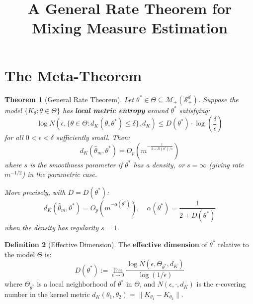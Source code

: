 \documentclass[11pt]{article}
\title{A General Rate Theorem for Mixing Measure Estimation}
\author{}
\date{}
\newtheorem{theorem}{Theorem}[section]
\theoremstyle{definition}
\newtheorem{definition}[theorem]{Definition}
\newcommand{\Splus}{\mathcal{S}_+^d}
\newcommand{\M}{\mathcal{M}}
\begin{document}
\maketitle

\section{The Meta-Theorem}

\begin{tcolorbox}[colback=blue!5!white, colframe=blue!50!black, title=Main Result]
\begin{theorem}[General Rate Theorem]
\label{thm:main}
Let $\theta^* \in \Theta \subseteq \M_+(\Splus)$. Suppose the model $\{K_\theta : \theta \in \Theta\}$ has \textbf{local metric entropy} around $\theta^*$ satisfying:
\begin{equation}
    \log N\left(\epsilon, \{\theta \in \Theta : d_K(\theta, \theta^*) \leq \delta\}, d_K\right) \leq D(\theta^*) \cdot \log\left(\frac{\delta}{\epsilon}\right)
\end{equation}
for all $0 < \epsilon < \delta$ sufficiently small. Then:
\begin{equation}
    \boxed{
    d_K(\hat{\theta}_m, \theta^*) = O_p\left(m^{-\frac{1}{2 + D(\theta^*)/s}}\right)
    }
\end{equation}
where $s$ is the smoothness parameter if $\theta^*$ has a density, or $s = \infty$ (giving rate $m^{-1/2}$) in the parametric case.

More precisely, with $D = D(\theta^*)$:
\begin{equation}
    \boxed{
    d_K(\hat{\theta}_m, \theta^*) = O_p\left(m^{-\alpha(\theta^*)}\right), \quad \alpha(\theta^*) = \frac{1}{2 + D(\theta^*)}
    }
\end{equation}
when the density has regularity $s = 1$.
\end{theorem}
\end{tcolorbox}

\begin{definition}[Effective Dimension]
\label{def:eff-dim}
The \textbf{effective dimension} of $\theta^*$ relative to the model $\Theta$ is:
\begin{equation}
    D(\theta^*) := \lim_{\epsilon \to 0} \frac{\log N(\epsilon, \Theta_{\theta^*}, d_K)}{\log(1/\epsilon)}
\end{equation}
where $\Theta_{\theta^*}$ is a local neighborhood of $\theta^*$ in $\Theta$, and $N(\epsilon, \cdot, d_K)$ is the $\epsilon$-covering number in the kernel metric $d_K(\theta_1, \theta_2) = \|K_{\theta_1} - K_{\theta_2}\|$.
\end{definition}
\end{document}

